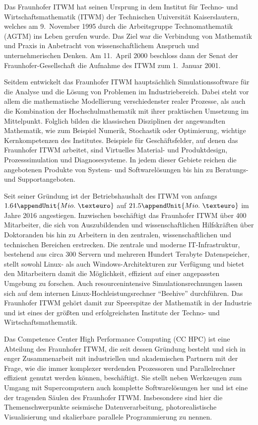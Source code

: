 \documentclass[crop=false]{standalone}
\begin{document}
  \begin{multicols}{2}
    \parskip=0pt
    \noindent
    Das Fraunhofer ITWM hat seinen Ursprung in dem Institut für Techno- und Wirtschaftsmathematik (ITWM) der Technischen Universität Kaiserslautern, welches am 9.~November 1995 durch die Arbeitsgruppe Technomathematik (AGTM) ins Leben gerufen wurde.
    Das Ziel war die Verbindung von Mathematik und Praxis in Anbetracht von wissenschaftlichem Anspruch und unternehmerischen Denken.
    Am 11.~April 2000 beschloss dann der Senat der Fraunhofer-Gesellschaft die Aufnahme des ITWM zum 1.~Januar 2001.

    Seitdem entwickelt das Fraunhofer ITWM hauptsächlich Simulationssoftware für die Analyse und die Lösung von Problemen im Industriebereich.
    Dabei steht vor allem die mathematische Modellierung verschiedenster realer Prozesse, als auch die Kombination der Hochschulmathematik mit ihrer praktischen Umsetzung im Mittelpunkt.
    Folglich bilden die klassischen Disziplinen der angewandten Mathematik, wie zum Beispiel Numerik, Stochastik oder Optimierung, wichtige Kernkompetenzen des Institutes.
    Beispiele für Geschäftsfelder, auf denen das Fraunhofer \hbox{ITWM} arbeitet, sind Virtuelles Material- und Produktdesign, Prozesssimulation und Diagnosesysteme.
    In jedem dieser Gebiete reichen die angebotenen Produkte von System- und Softwarelösungen bis hin zu Beratungs- und Supportangeboten.

    Seit seiner Gründung ist der Betriebshaushalt des ITWM von anfangs $1.64\appendUnit{Mio.\ €}$ auf $21.5\appendUnit{Mio.\ €}$ im Jahre 2016 angestiegen.
    Inzwischen beschäftigt das Fraunhofer ITWM über 400 Mitarbeiter, die sich von Auszubildenden und wissenschaftlichen Hilfskräften über Doktoranden bis hin zu Arbeitern in den zentralen, wissenschaftlichen und technischen Bereichen erstrecken.
    Die zentrale und moderne IT-Infrastruktur, bestehend aus circa 300 Servern und mehreren Hundert Terabyte Datenspeicher, stellt sowohl Linux- als auch Windows-Architekturen zur Verfügung und bietet den Mitarbeitern damit die  Möglichkeit, effizient auf einer angepassten Umgebung zu forschen.
    Auch resourcenintensive Simulationsrechnungen lassen sich auf dem internen Linux-Hochleistungsrechner \enquote{Beehive} durchführen.
    Das Fraunhofer ITWM gehört damit zur Speerspitze der Mathematik in der Industrie und ist eines der größten und erfolgreichsten Institute der Techno- und Wirtschaftsmathematik.

    Das Competence Center High Performance Computing (CC HPC) ist eine Abteilung des Fraunhofer ITWM, die seit dessen Gründung besteht und sich in enger Zusammenarbeit mit industriellen und akademischen Partnern mit der Frage, wie die immer komplexer werdenden Prozessoren und Parallelrechner effizient genutzt werden können, beschäftigt.
    Sie stellt neben Werkzeugen zum Umgang mit Supercomputern auch komplette Softwarelösungen her und ist eine der tragenden Säulen des Fraunhofer ITWM.
    Insbesondere sind hier die Themenschwerpunkte seismische Datenverarbeitung, photorealistische Visualisierung und skalierbare parallele Programmierung zu nennen.
  \end{multicols}

  \restoregeometry
\end{document}
